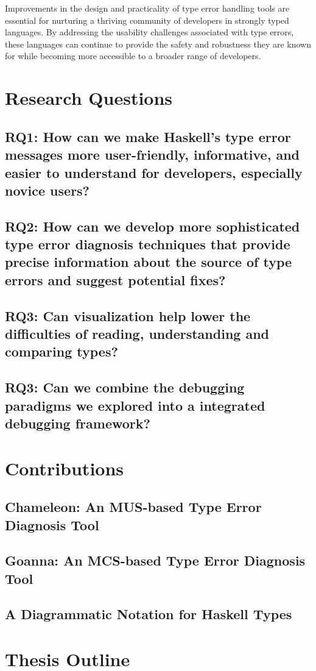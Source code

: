 Improvements in the design and practicality of type error handling tools are essential for nurturing a thriving community of developers in strongly typed languages. By addressing the usability challenges associated with type errors, these languages can continue to provide the safety and robustness they are known for while becoming more accessible to a broader range of developers.






\section{Research Questions} \label{sec:research-questions}


\subsection{RQ1: How can we make Haskell's type error messages more user-friendly, informative, and easier to understand for developers, especially novice users?}

\subsection{RQ2: How can we develop more sophisticated type error diagnosis techniques that provide precise information about the source of type errors and suggest potential fixes?}


\subsection{RQ3: Can visualization help lower the difficulties of reading, understanding and comparing types?}


\subsection{RQ3: Can we combine the debugging paradigms we explored into a integrated debugging framework?}

\section{Contributions}  \label{sec:contributions}

\subsection{Chameleon: An MUS-based Type Error Diagnosis Tool}


\subsection{Goanna: An MCS-based Type Error Diagnosis Tool}


\subsection{A Diagrammatic Notation for Haskell Types}


\section{Thesis Outline}